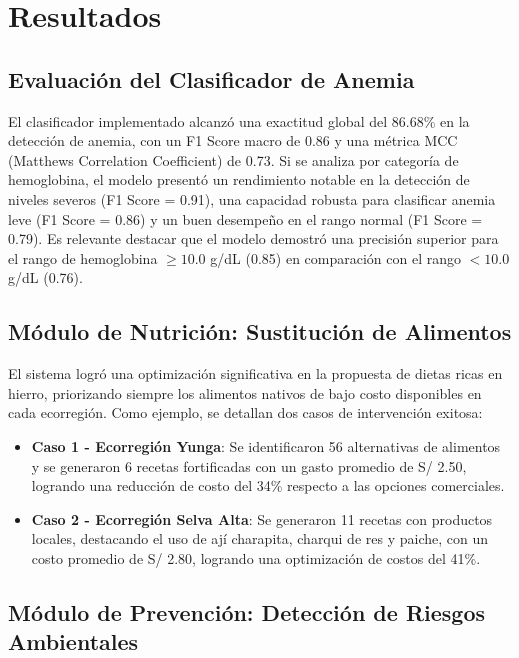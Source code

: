 \section{Resultados}
\label{sec:resultados}

\subsection{Evaluación del Clasificador de Anemia}
\label{sec:evaluacion_clasificador}

El clasificador implementado alcanzó una exactitud global del 86.68\% en la detección de anemia, con un F1 Score macro de 0.86 y una métrica $\text{MCC}$ (Matthews Correlation Coefficient) de 0.73. Si se analiza por categoría de hemoglobina, el modelo presentó un rendimiento notable en la detección de niveles severos (F1 Score = 0.91), una capacidad robusta para clasificar anemia leve (F1 Score = 0.86) y un buen desempeño en el rango normal (F1 Score = 0.79). Es relevante destacar que el modelo demostró una precisión superior para el rango de hemoglobina $\ge 10.0$ g/dL (0.85) en comparación con el rango $< 10.0$ g/dL (0.76).


\subsection{Módulo de Nutrición: Sustitución de Alimentos}
\label{sec:resultados_nutricion}

El sistema logró una optimización significativa en la propuesta de dietas ricas en hierro, priorizando siempre los alimentos nativos de bajo costo disponibles en cada ecorregión. Como ejemplo, se detallan dos casos de intervención exitosa:

\begin{itemize}
    \item \textbf{Caso 1 - Ecorregión Yunga}: Se identificaron 56 alternativas de alimentos y se generaron 6 recetas fortificadas con un gasto promedio de S/ 2.50, logrando una reducción de costo del 34\% respecto a las opciones comerciales.
    \item \textbf{Caso 2 - Ecorregión Selva Alta}: Se generaron 11 recetas con productos locales, destacando el uso de ají charapita, charqui de res y paiche, con un costo promedio de S/ 2.80, logrando una optimización de costos del 41\%.
\end{itemize}


\subsection{Módulo de Prevención: Detección de Riesgos Ambientales}
\label{sec:resultados_prevencion}


